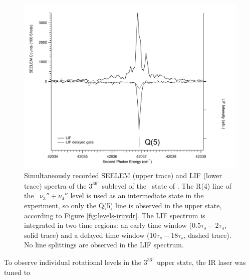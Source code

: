 \documentclass[12pt]{mitthesis}
\begin{document}
\begin{figure}
  \caption{Simultaneously recorded SEELEM (upper trace) and LIF (lower
    trace) spectra of the $3^36^1$  sublevel of the \astate\
    state of .  The R(4) line of the \xstate\ $\nu_3'' +
    \nu_4''$ level is used as an intermediate state in the experiment,
    so only the Q(5) line is observed in the upper state, according to
    Figure \ref{fig:levels-iruvdr}.  The LIF spectrum is integrated in
    two time regions: an early time window ($0.5\tau_s-2\tau_s$, solid
    trace) and a delayed time window ($10\tau_s-18\tau_s$, dashed
    trace).  No line splittings are observed in the LIF spectrum.}
  \label{fig:3361-q5}
  \centering
  \includegraphics[width=6in]{spectrum-3361-q5-split.pdf}
\end{figure}


To observe individual rotational levels in the $3^36^1$  upper
state, the IR laser was tuned to
\end{document}
